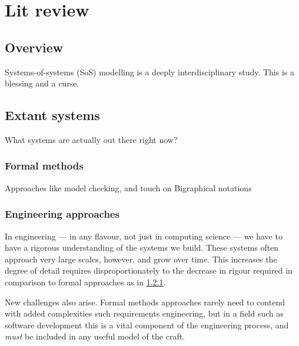 \chapter{Lit review}

\section{Overview}

Systems-of-systems (SoS) modelling is a deeply interdisciplinary study. This is a blessing and a curse.
\par


\section{Extant systems}
What systems are actually out there right now?


\subsection{Formal methods}\label{sec:review-formal-methods}

Approaches like model checking, and touch on Bigraphical notations
\par

\subsection{Engineering approaches}

In engineering --- in any flavour, not just in computing science --- we have to have a rigorous understanding of the systems we build. 
These systems often approach very large scales, however, and grow over time.
This increases the degree of detail requires disproportionately to the decrease in rigour required in comparison to formal approaches as in \ref{sec:review-formal-methods}.
\par

New challenges also arise. Formal methods approaches rarely need to contend with added complexities such requirements engineering, but in a field such as software development this is a vital component of the engineering process, and \emph{must} be included in any useful model of the craft.
\par


